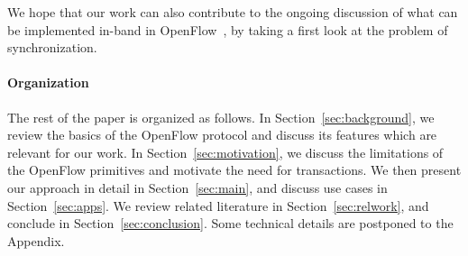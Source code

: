 \documentclass[conference]{sigcomm-alternate}
\begin{document}
We hope that our work can also contribute to the ongoing discussion of what can be implemented
in-band in OpenFlow~\cite{compute,reclaim}, by taking a first look
at the problem of synchronization.



\paragraph{Organization}
The rest of the paper is organized as follows.
In Section~\ref{sec:background}, we review the basics of the  OpenFlow
protocol and discuss its features which are relevant for our work.
In Section~\ref{sec:motivation}, we discuss the limitations of the OpenFlow
primitives and motivate the need for transactions.
We then present our approach in detail in Section~\ref{sec:main}, and discuss use cases in Section~\ref{sec:apps}.
We review related literature in Section~\ref{sec:relwork}, and conclude
in Section~\ref{sec:conclusion}. Some technical details are postponed
to the Appendix.

\end{document}
